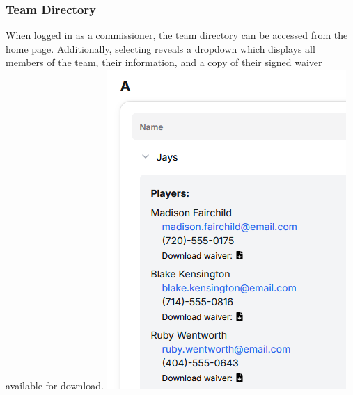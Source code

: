 \documentclass{article}
\begin{document}
            \subsubsection{Team Directory}
                When logged in as a commissioner, the team directory can be accessed
                from the home page. Additionally, selecting reveals a dropdown which
                displays all members of the team, their information, and a copy
                of their signed waiver available for download.
                \newline \includegraphics[scale=0.6]{team-directory.png}
\end{document}

